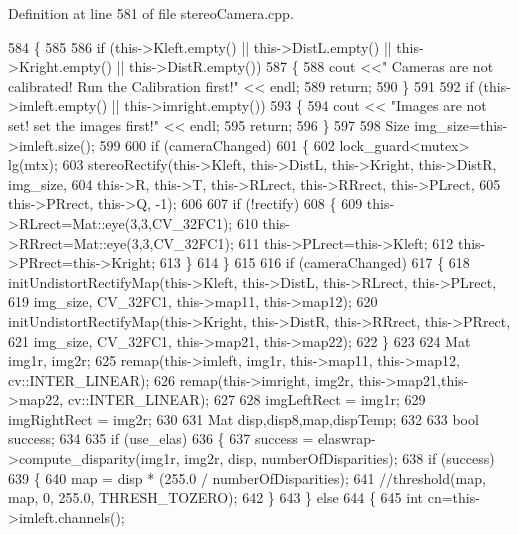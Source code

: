 Definition at line 581 of file stereo\+Camera.\+cpp.


\begin{DoxyCode}
584 \{
585 
586     \textcolor{keywordflow}{if} (this->Kleft.empty() || this->DistL.empty() || this->Kright.empty() || this->DistR.empty())
587     \{
588         cout <<\textcolor{stringliteral}{" Cameras are not calibrated! Run the Calibration first!"} << endl;
589         \textcolor{keywordflow}{return};
590     \}
591 
592     \textcolor{keywordflow}{if} (this->imleft.empty() || this->imright.empty())
593     \{
594         cout << \textcolor{stringliteral}{"Images are not set! set the images first!"} << endl;
595         \textcolor{keywordflow}{return};
596     \}
597 
598     Size img\_size=this->imleft.size();
599 
600     \textcolor{keywordflow}{if} (cameraChanged)
601     \{
602         lock\_guard<mutex> lg(mtx);
603         stereoRectify(this->Kleft, this->DistL, this->Kright, this->DistR, img\_size,
604                 this->R, this->T, this->RLrect, this->RRrect, this->PLrect,
605                 this->PRrect, this->Q, -1);
606 
607         \textcolor{keywordflow}{if} (!rectify)
608         \{
609             this->RLrect=Mat::eye(3,3,CV\_32FC1);
610             this->RRrect=Mat::eye(3,3,CV\_32FC1);
611             this->PLrect=this->Kleft;
612             this->PRrect=this->Kright;
613         \}
614     \}
615 
616     \textcolor{keywordflow}{if} (cameraChanged)
617     \{
618         initUndistortRectifyMap(this->Kleft, this->DistL, this->RLrect, this->PLrect,
619                 img\_size, CV\_32FC1, this->map11, this->map12);
620         initUndistortRectifyMap(this->Kright,  this->DistR, this->RRrect, this->PRrect,
621                 img\_size, CV\_32FC1, this->map21, this->map22);
622     \}
623 
624     Mat img1r, img2r;
625     remap(this->imleft, img1r, this->map11, this->map12, cv::INTER\_LINEAR);
626     remap(this->imright, img2r, this->map21,this->map22, cv::INTER\_LINEAR);
627 
628     imgLeftRect = img1r;
629     imgRightRect = img2r;
630 
631     Mat disp,disp8,map,dispTemp;
632 
633     \textcolor{keywordtype}{bool} success;
634 
635     \textcolor{keywordflow}{if} (use\_elas)
636     \{
637         success = elaswrap->compute\_disparity(img1r, img2r, disp, numberOfDisparities);
638         \textcolor{keywordflow}{if} (success)
639         \{
640             map = disp * (255.0 / numberOfDisparities);
641             \textcolor{comment}{//threshold(map, map, 0, 255.0, THRESH\_TOZERO);}
642         \}
643     \} \textcolor{keywordflow}{else}
644     \{
645         \textcolor{keywordtype}{int} cn=this->imleft.channels();

\end{DoxyCode}
